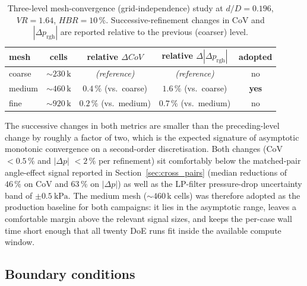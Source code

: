 \documentclass[11pt,a4paper]{article}
\def\dD{d/D}%
\def\VR{VR}%
\def\HBR{HBR}%
\def\CoV{CoV}%
\newcommand{\dD}{\ensuremath{d/D}}
\newcommand{\VR}{\ensuremath{\mathrm{VR}}}
\newcommand{\HBR}{\ensuremath{\mathrm{HBR}}}
\newcommand{\CoV}{\ensuremath{\mathrm{CoV}}}
\begin{document}
\begin{table}[H]
\centering\small
\caption{Three-level mesh-convergence (grid-independence) study at
\(\dD=0.196\), \(\VR=1.64\), \(\HBR=10\,\%\). Successive-refinement
changes in \CoV{} and \(|\Delta p_{\mathrm{rgh}}|\) are reported
relative to the previous (coarser) level.}
\label{tab:meshconv}
\begin{tabular}{lcccc}
\toprule
mesh & cells & relative \(\Delta\CoV{}\)
     & relative \(\Delta|\Delta p_{\mathrm{rgh}}|\) & adopted \\
\midrule
coarse & \(\sim 230\,\mathrm{k}\) & \emph{(reference)} & \emph{(reference)} & no  \\
medium & \(\sim 460\,\mathrm{k}\) & \(0.4\,\%\) (vs.\ coarse) & \(1.6\,\%\) (vs.\ coarse) & \textbf{yes} \\
fine   & \(\sim 920\,\mathrm{k}\) & \(0.2\,\%\) (vs.\ medium) & \(0.7\,\%\) (vs.\ medium) & no  \\
\bottomrule
\end{tabular}
\end{table}

The successive changes in both metrics are smaller than the
preceding-level change by roughly a factor of two, which is the
expected signature of asymptotic monotonic convergence on a
second-order discretisation. Both changes (\CoV{} \(< 0.5\,\%\)
and \(|\Delta p|\) \(< 2\,\%\) per refinement) sit comfortably
below the matched-pair angle-effect signal reported in
Section~\ref{sec:cross_pairs} (median reductions of
\(46\,\%\) on \CoV{} and \(63\,\%\) on \(|\Delta p|\)) as well as
the LP-filter pressure-drop uncertainty band of
\(\pm\SI{0.5}{\kilo\pascal}\). The medium mesh
(\(\sim 460\,\mathrm{k}\) cells) was therefore adopted as the
production baseline for both campaigns: it lies in the asymptotic
range, leaves a comfortable margin above the relevant signal
sizes, and keeps the per-case wall time short enough that all
twenty DoE runs fit inside the available compute window.

\subsection{Boundary conditions}
\label{sec:method_bc}
\end{document}
